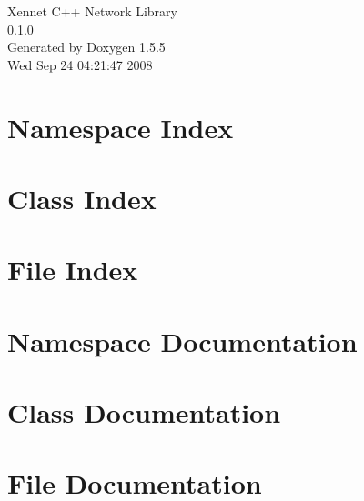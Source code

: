 \documentclass[a4paper]{book}
\begin{document}
\begin{titlepage}
\vspace*{7cm}
\begin{center}
{\Large Xennet C++ Network Library \\[1ex]\large 0.1.0 }\\
\vspace*{1cm}
{\large Generated by Doxygen 1.5.5}\\
\vspace*{0.5cm}
{\small Wed Sep 24 04:21:47 2008}\\
\end{center}
\end{titlepage}
\clearemptydoublepage
{}
\tableofcontents
\clearemptydoublepage
{}
\chapter{Namespace Index}

\chapter{Class Index}

\chapter{File Index}

\chapter{Namespace Documentation}

\chapter{Class Documentation}







\chapter{File Documentation}























\printindex
\end{document}
